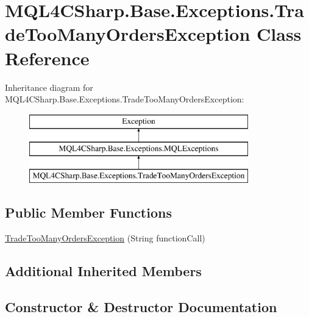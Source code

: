 \hypertarget{class_m_q_l4_c_sharp_1_1_base_1_1_exceptions_1_1_trade_too_many_orders_exception}{}\section{M\+Q\+L4\+C\+Sharp.\+Base.\+Exceptions.\+Trade\+Too\+Many\+Orders\+Exception Class Reference}
\label{class_m_q_l4_c_sharp_1_1_base_1_1_exceptions_1_1_trade_too_many_orders_exception}
Inheritance diagram for M\+Q\+L4\+C\+Sharp.\+Base.\+Exceptions.\+Trade\+Too\+Many\+Orders\+Exception\+:\begin{figure}[H]
\begin{center}
\leavevmode
\includegraphics[height=3.000000cm]{class_m_q_l4_c_sharp_1_1_base_1_1_exceptions_1_1_trade_too_many_orders_exception}
\end{center}
\end{figure}
\subsection*{Public Member Functions}
\begin{DoxyCompactItemize}
\item 
\hyperlink{class_m_q_l4_c_sharp_1_1_base_1_1_exceptions_1_1_trade_too_many_orders_exception_ad13ca7b6b258b7716c98164cda428bc3}{Trade\+Too\+Many\+Orders\+Exception} (String function\+Call)
\end{DoxyCompactItemize}
\subsection*{Additional Inherited Members}


\subsection{Constructor \& Destructor Documentation}
